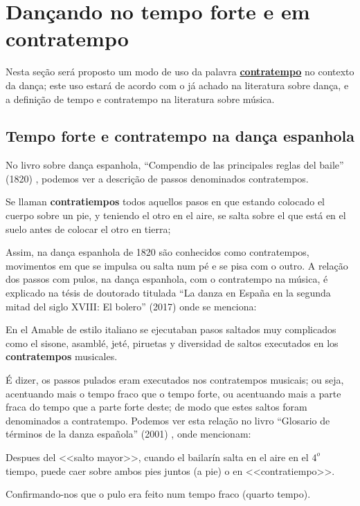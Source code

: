 
\section{Dançando no tempo forte e em contratempo}

Nesta seção será proposto um modo de uso da palavra 
\hyperref[sec:contratempo]{\textbf{contratempo}} no contexto da dança;
este uso estará de acordo com o já achado na literatura  sobre dança,
e a definição de tempo e contratempo na literatura sobre música.

\subsection{Tempo forte e contratempo na dança espanhola}
\label{subsec:contratempoespanha}
No livro sobre dança espanhola, ``Compendio de las principales reglas del baile'' (1820) \cite[pp. 131]{cairon1820compendio},
podemos ver a descrição de passos denominados contratempos.
\begin{citando}
Se llaman \textbf{contratiempos} todos aquellos pasos en que estando colocado el cuerpo sobre un pie,
y teniendo el otro en el aire,
se salta sobre el que está en el suelo antes de colocar el otro en tierra;
\end{citando}
Assim, na dança espanhola de 1820 são conhecidos como contratempos,
movimentos em que se impulsa ou salta num pé e se pisa com o outro. 
A relação dos passos com pulos, na dança espanhola, 
com o contratempo na música, 
é explicado na tésis de doutorado titulada 
``La danza en España en la segunda mitad del siglo XVIII: El bolero'' (2017)
\cite[pp. 160]{martin2017danza} onde se menciona:
\begin{citando}
En el Amable de estilo italiano se ejecutaban pasos saltados muy complicados como el sisone,
asamblé, jeté, piruetas y diversidad de saltos executados en los \textbf{contratempos} musicales.
\end{citando}
É dizer, os passos pulados eram executados nos contratempos musicais;
ou seja, acentuando mais o tempo fraco que o tempo forte,
ou acentuando mais a parte fraca do tempo que a parte forte deste;
de modo que estes saltos foram denominados a contratempo.
Podemos ver esta relação no livro ``Glosario de términos de la danza española'' (2001)
\cite[pp. 109]{aubero2001glosario}, onde mencionam:
\begin{citando}
Despues del <<salto mayor>>, cuando el bailarín salta en el aire en el $4^o$ tiempo,
puede caer sobre ambos pies juntos (a pie) o en <<contratiempo>>.
\end{citando}
Confirmando-nos que o pulo era feito num tempo fraco (quarto tempo).



